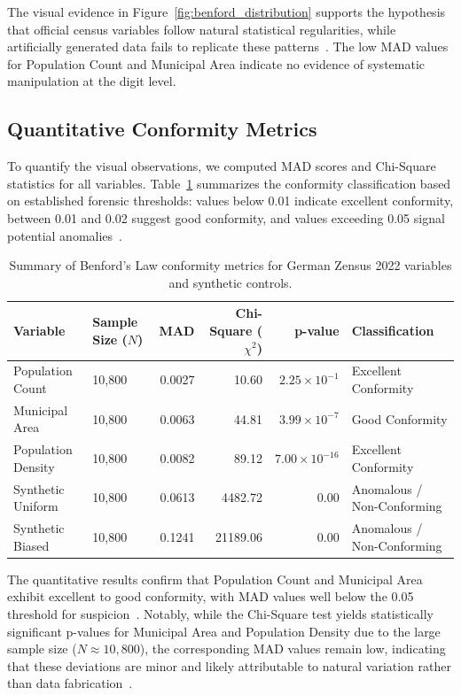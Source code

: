 \documentclass[11pt,a4paper]{article}
\begin{document}
The visual evidence in Figure~\ref{fig:benford_distribution} supports the hypothesis that official census variables follow natural statistical regularities, while artificially generated data fails to replicate these patterns~\cite{Ivanova2025BenfordsLA}. The low MAD values for Population Count and Municipal Area indicate no evidence of systematic manipulation at the digit level.

\subsection{Quantitative Conformity Metrics}

To quantify the visual observations, we computed MAD scores and Chi-Square statistics for all variables. Table~\ref{tab:benford_metrics} summarizes the conformity classification based on established forensic thresholds: values below 0.01 indicate excellent conformity, between 0.01 and 0.02 suggest good conformity, and values exceeding 0.05 signal potential anomalies~\cite{Druica2018BenfordsLA}.

\begin{table}[ht]
\caption{Summary of Benford's Law conformity metrics for German Zensus 2022 variables and synthetic controls.}
\label{tab:benford_metrics}
\centering
\begin{tabular}{@{}llrrrl@{}}
\toprule
Variable & Sample Size ($N$) & MAD & Chi-Square ($\chi^2$) & p-value & Classification \\
\midrule
Population Count & 10,800 & 0.0027 & 10.60 & $2.25 \times 10^{-1}$ & Excellent Conformity \\
Municipal Area & 10,800 & 0.0063 & 44.81 & $3.99 \times 10^{-7}$ & Good Conformity \\
Population Density & 10,800 & 0.0082 & 89.12 & $7.00 \times 10^{-16}$ & Excellent Conformity \\
Synthetic Uniform & 10,800 & 0.0613 & 4482.72 & $0.00$ & Anomalous / Non-Conforming \\
Synthetic Biased & 10,800 & 0.1241 & 21189.06 & $0.00$ & Anomalous / Non-Conforming \\
\bottomrule
\end{tabular}
\end{table}

The quantitative results confirm that Population Count and Municipal Area exhibit excellent to good conformity, with MAD values well below the 0.05 threshold for suspicion~\cite{Druica2018BenfordsLA}. Notably, while the Chi-Square test yields statistically significant p-values for Municipal Area and Population Density due to the large sample size ($N \approx 10,800$), the corresponding MAD values remain low, indicating that these deviations are minor and likely attributable to natural variation rather than data fabrication~\cite{Shalini2023DataQA}.
\end{document}
